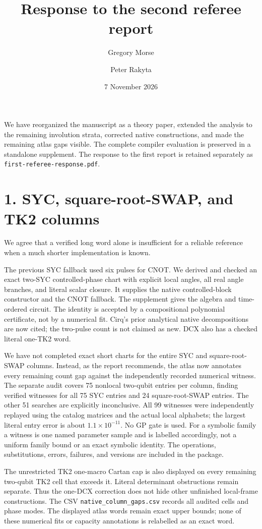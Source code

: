 \documentclass[11pt]{article}
\title{Response to the second referee report}
\author{Gregory Morse \and Peter Rakyta}\date{7 November 2026}
\begin{document}
\maketitle
We have reorganized the manuscript as a theory paper, extended the analysis
to the remaining involution strata, corrected native constructions, and
made the remaining atlas gaps visible. The complete compiler evaluation is
preserved in a standalone supplement. The response to the first report is
retained separately as \texttt{first-referee-response.pdf}.

\section*{1. SYC, square-root-SWAP, and TK2 columns}
We agree that a verified long word alone is insufficient for a reliable
reference when a much shorter implementation is known.

The previous SYC fallback used six pulses for CNOT. We derived and checked
an exact two-SYC controlled-phase chart with explicit local angles, all real
angle branches, and literal scalar closure. It supplies the native
controlled-block constructor and the CNOT fallback. The supplement gives
the algebra and time-ordered circuit. The identity is accepted by a
compositional polynomial certificate, not by a numerical fit. Cirq's prior
analytical native decompositions are now cited; the two-pulse count is not
claimed as new. DCX also has a checked literal one-TK2 word.

We have not completed exact short charts for the entire SYC and
square-root-SWAP columns. Instead, as the report recommends, the atlas now
annotates every remaining count gap against the independently recorded
numerical witness. The separate audit covers 75 nonlocal two-qubit entries
per column, finding verified witnesses for all 75 SYC entries and 24
square-root-SWAP entries. The other 51 searches are explicitly inconclusive.
All 99 witnesses were independently replayed using the catalog matrices
and the actual local alphabets; the largest literal entry error is about
$1.1\times10^{-11}$. No GP gate is used. For a symbolic family a witness
is one named parameter sample and is labelled accordingly, not a uniform
family bound or an exact symbolic identity. The operations, substitutions,
errors, failures, and versions are included in the package.

The unrestricted TK2 one-macro Cartan cap is also displayed on every
remaining two-qubit TK2 cell that exceeds it. Literal determinant
obstructions remain separate. Thus the one-DCX correction does not hide
other unfinished local-frame constructions. The CSV
\texttt{native\_column\_gaps.csv} records all audited cells and phase modes.
The displayed atlas words remain exact upper bounds; none of these
numerical fits or capacity annotations is relabelled as an exact word.
\end{document}
